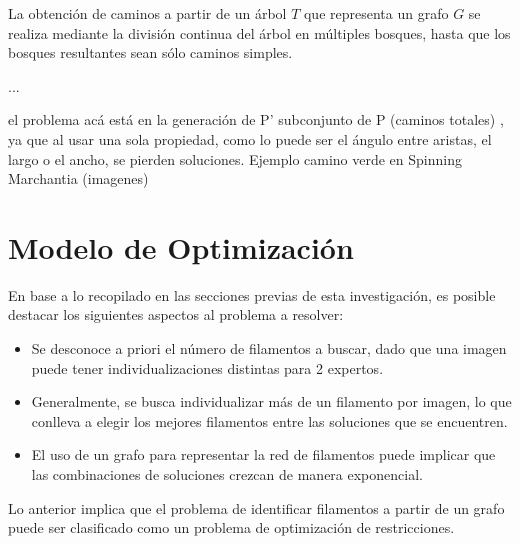 La obtenci\'on de caminos a partir de un \'arbol $T$ que representa un grafo $G$ se realiza mediante la divisi\'on continua del \'arbol en m\'ultiples bosques, hasta que los bosques resultantes sean s\'olo caminos simples.

...


el problema acá está en la generación de P' subconjunto de P (caminos totales) , ya que al usar una sola propiedad, como lo puede ser el ángulo entre aristas, el largo o el ancho, se pierden soluciones. Ejemplo camino verde en Spinning Marchantia (imagenes)





\section{Modelo de Optimización}

En base a lo recopilado en las secciones previas de esta investigaci\'on, es posible destacar los siguientes aspectos al problema a resolver:

\begin{itemize}
    \item Se desconoce a priori el n\'umero de filamentos a buscar, dado que una imagen puede tener individualizaciones distintas para 2 expertos.
    \item Generalmente, se busca individualizar m\'as de un filamento por imagen, lo que conlleva a elegir los mejores filamentos entre las soluciones que se encuentren.
    \item El uso de un grafo para representar la red de filamentos puede implicar que las combinaciones de soluciones crezcan de manera exponencial.
\end{itemize}

Lo anterior implica que el problema de identificar filamentos a partir de un grafo puede ser clasificado como un problema de optimizaci\'on de restricciones\cite{blum2011hybrid}.

